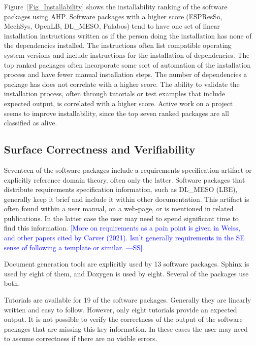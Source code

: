 \documentclass[final, 3p, times, authoryear]{elsarticle}
\newcommand{\authornote}[3]{\textcolor{#1}{[#3 ---#2]}}
\newcommand{\authornote}[3]{}
\newcommand{\wss}[1]{\authornote{blue}{SS}{#1}} %
\begin{document}
Figure~\ref{Fig_Installability} shows the installability ranking of the software
packages using AHP. Software packages with a higher score (ESPResSo, MechSys,
OpenLB, DL\_MESO, Palabos) tend to have one set of linear installation
instructions written as if the person doing the installation has none of the
dependencies installed. The instructions often list compatible operating system
versions and include instructions for the installation of dependencies. The top
ranked packages often incorporate some sort of automation of the installation
process and have fewer manual installation steps. The number of dependencies a
package has does not correlate with a higher score. The ability to validate the
installation process, often through tutorials or test examples that include
expected output, is correlated with a higher score. Active work on a project
seems to improve installability, since the top seven ranked packages are all
classified as alive. 
 
\subsection{Surface Correctness and Verifiability}

Seventeen of the software packages include a requirements specification artifact
or explicitly reference domain theory, often only the latter. Software packages
that distribute requirements specification information, such as DL\_MESO (LBE),
generally keep it brief and include it within other documentation. This artifact
is often found within a user manual, on a web-page, or is mentioned in related
publications. In the latter case the user may need to spend significant time to
find this information.  \wss{More on requirements as a pain point is given in
Weiss, and other papers cited by Carver (2021).  Isn't generally requirements in
the SE sense of following a template or similar.}

Document generation tools are explicitly used by 13 software packages. Sphinx is
used by eight of them, and Doxygen is used by eight. Several of the packages use
both.

Tutorials are available for 19 of the software packages. Generally they are
linearly written and easy to follow. However, only eight tutorials provide an
expected output. It is not possible to verify the correctness of the output of
the software packages that are missing this key information. In these cases the
user may need to assume correctness if there are no visible errors.
\end{document}
